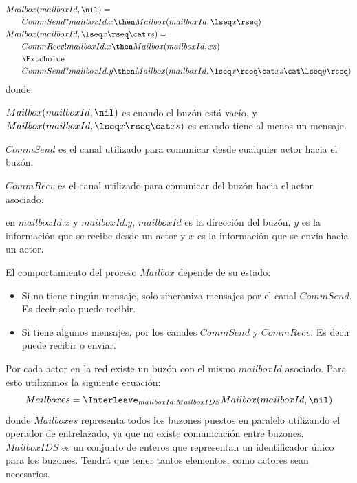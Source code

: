 \begin{align}\label{eq:mailbox}
\begin{split}
Mai&lbox(mailboxId, \nil) = {} \\
&CommSend?mailboxId.x \then Mailbox(mailboxId, \lseq x \rseq) \\
Mai&lbox(mailboxId, \lseq x \rseq \cat xs ) = {} \\ 
   &CommRecv!mailboxId.x \then Mailbox(mailboxId, xs) \\
   &\Extchoice \\
   &CommSend?mailboxId.y \then Mailbox(mailboxId, \lseq x \rseq \cat xs \cat \lseq y \rseq ) 
\end{split}
\end{align}
donde:
\begin{description}
 \item $Mailbox(mailboxId, \nil)$ es cuando el buzón está vacío, y $Mailbox(mailboxId, \lseq x \rseq \cat xs )$ es cuando tiene al menos un mensaje. 
 \item $CommSend$ es el canal utilizado para comunicar desde cualquier actor hacia el buzón.
 \item $CommRecv$ es el canal utilizado para comunicar del buzón hacia el actor asociado.
 \item en $mailboxId.x$ y $mailboxId.y$, $mailboxId$ es la dirección del buzón, $y$ es la información que se recibe desde un actor y $x$ es la información que se envía hacia un actor.
 \end{description}
El comportamiento del proceso $Mailbox$ depende de su estado:
\begin{itemize}
\item Si no tiene ningún mensaje, solo sincroniza mensajes por el canal $CommSend$. Es decir solo puede recibir.
\item Si tiene algunos mensajes, por los canales $CommSend$ y $CommRecv$. Es decir puede recibir o enviar.
\end{itemize}

Por cada actor en la red existe un buzón con el mismo $mailboxId$ asociado. Para esto utilizamos la siguiente ecuación:
\begin{equation}\label{eq:mailboxes}
Mailboxes = \Interleave_{ mailboxId : MailboxIDS } Mailbox(mailboxId, \nil) 
\end{equation}
donde $Mailboxes$ representa todos los buzones puestos en paralelo utilizando el operador de entrelazado, ya que no existe comunicación entre buzones. $MailboxIDS$ es un conjunto de enteros que representan un identificador único para los buzones. Tendrá que tener tantos elementos, como actores sean necesarios.

